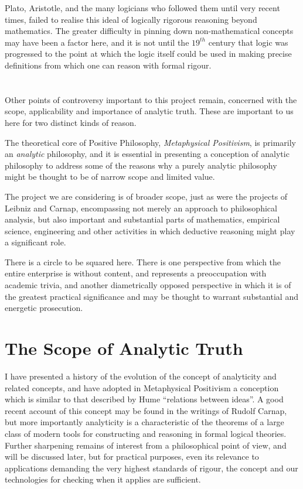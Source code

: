 Plato, Aristotle, and the many logicians who followed them until very
recent times, failed to realise this ideal of logically rigorous
reasoning beyond mathematics.
The greater difficulty in pinning down non-mathematical concepts may
have been a factor here, and it is not until the $19^{th}$ century
that logic was progressed to the point at which the logic itself could
be used in making precise definitions from which one can reason with
formal rigour. 

\section{}

Other points of controversy important to this project remain,
concerned with the scope, applicability and importance of analytic
truth.
These are important to us here for two distinct kinds of reason.

The theoretical core of Positive Philosophy, \emph{Metaphysical
  Positivism}, is primarily an \emph{analytic} philosophy, and it is
essential in presenting a conception of analytic philosophy to address
some of the reasons why a purely analytic philosophy might be thought
to be of narrow scope and limited value.

The project we are considering is of broader scope, just as were the
projects of Leibniz and Carnap, encompassing not merely an approach to
philosophical analysis, but also important and substantial parts of
mathematics, empirical science, engineering and other activities in
which deductive reasoning might play a significant role.

There is a circle to be squared here.
There is one perspective from which the entire enterprise is without
content, and represents a preoccupation with academic trivia, and
another diametrically opposed perspective in which it is of the
greatest practical significance and may be thought to warrant
substantial and energetic prosecution.

\section{The Scope of Analytic Truth}

I have presented a history of the evolution of the concept of
analyticity and related concepts, and have adopted in Metaphysical
Positivism a conception which is similar to that described by Hume
``relations between ideas''.
A good recent account of this concept may be found in the writings of
Rudolf Carnap, but more importantly analyticity is a characteristic of
the theorems of a large class of modern tools for constructing and
reasoning in formal logical theories.
Further sharpening remains of interest from a philosophical point of
view, and will be discussed later, but for practical purposes, even
its relevance to applications demanding the very highest standards of
rigour, the concept and our technologies for checking when it applies
are sufficient.

